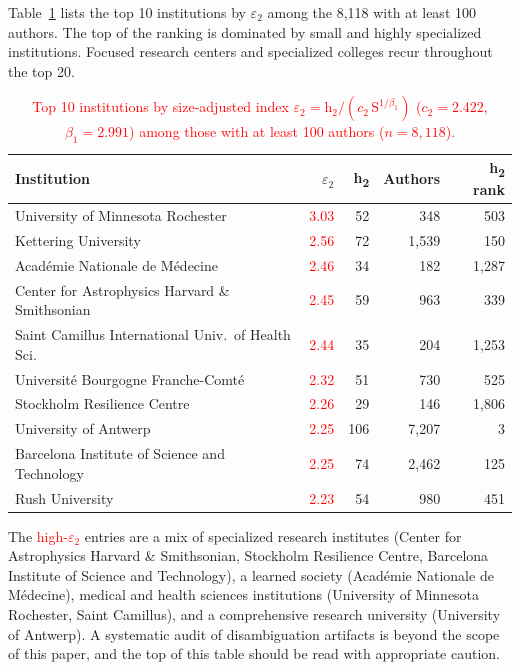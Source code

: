 Table~\ref{tab:h2-efficiency-all} lists the top 10 institutions by $\varepsilon_2$ among the 8,118 with at least 100 authors. The top of the ranking is dominated by small and highly specialized institutions. Focused research centers and specialized colleges recur throughout the top 20.

\begin{table}[h]
	\centering
	\caption{\textcolor{red}{Top 10 institutions by size-adjusted index $\varepsilon_2 = \mathrm{h}_2 / (c_2\,\mathrm{S}^{1/\beta_1})$ ($c_2 = 2.422$, $\beta_1 = 2.991$) among those with at least 100 authors ($n = 8{,}118$).}}
	\label{tab:h2-efficiency-all}
	\begin{tabular}{@{}lrrrr@{}}
	\toprule
	Institution & $\varepsilon_2$ & h\textsubscript{2} & Authors & h\textsubscript{2} rank \\
	\midrule
	University of Minnesota Rochester                     & \textcolor{red}{3.03} & 52 & 348   & 503   \\
	Kettering University                                  & \textcolor{red}{2.56} & 72 & 1,539 & 150   \\
	Acad\'{emie Nationale de M\'{e}decine}               & \textcolor{red}{2.46} & 34 & 182   & 1,287 \\
	Center for Astrophysics Harvard \& Smithsonian        & \textcolor{red}{2.45} & 59 & 963   & 339   \\
	Saint Camillus International Univ.\ of Health Sci.   & \textcolor{red}{2.44} & 35 & 204   & 1,253 \\
	Universit\'{e Bourgogne Franche-Comt\'{e}}           & \textcolor{red}{2.32} & 51 & 730   & 525   \\
	Stockholm Resilience Centre                           & \textcolor{red}{2.26} & 29 & 146   & 1,806 \\
	University of Antwerp                                 & \textcolor{red}{2.25} & 106 & 7,207 & 3     \\
	Barcelona Institute of Science and Technology         & \textcolor{red}{2.25} & 74 & 2,462 & 125   \\
	Rush University                                       & \textcolor{red}{2.23} & 54 & 980   & 451   \\
	\bottomrule
	\end{tabular}
\end{table}

The \textcolor{red}{high-$\varepsilon_2$} entries are a mix of specialized research institutes (Center for Astrophysics Harvard \& Smithsonian, Stockholm Resilience Centre, Barcelona Institute of Science and Technology), a learned society (Acad\'{e}mie Nationale de M\'{e}decine), medical and health sciences institutions (University of Minnesota Rochester, Saint Camillus), and a comprehensive research university (University of Antwerp). A systematic audit of disambiguation artifacts is beyond the scope of this paper, and the top of this table should be read with appropriate caution.

